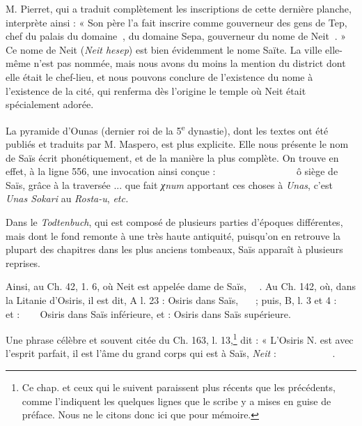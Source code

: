 \documentclass[letterpaper,twocolumn,openany,nodeprecatedcode]{dndbook}
\newcommand*\hieroAAAD{}
\newcommand*\hieroAAAF{}
\newcommand*\hieroAAAG{}
\newcommand*\hieroAAAH{}
\newcommand*\hieroAAAI{}
\newcommand*\hieroAAAQ{}
\newcommand*\hieroAAAW{\raisebox{0.5ex}{}}
\newcommand*\hieroAABC{\raisebox{0.5ex}{}}
\newcommand*\hieroAABG{}
\newcommand*\hieroAABR{}
\newcommand*\hieroAABU{}
\newcommand*\hieroAABV{}
\newcommand*\hieroAABW{}
\newcommand*\hieroAABX{}
\newcommand*\hieroAABY{\raisebox{0.5ex}{}}
\newcommand*\hieroAABZ{}
\newcommand*\hieroAACA{}
\newcommand*\hieroAACB{\raisebox{0.5ex}{}}
\newcommand*\hieroAACC{}
\newcommand*\hieroAACD{}
\newcommand*\hieroAACE{}
\newcommand*\hieroAACF{}
\newcommand*\hieroAACG{}
\newcommand*\hieroAACH{}
\newcommand*\hieroAACI{}
\newcommand*\hieroAACJ{}
\newcommand*\hieroAACK{}
\newcommand*\hieroAACL{\raisebox{0.5ex}{}}
\newcommand*\hieroAACM{}
\newcommand*\hieroAACN{\raisebox{1ex}{}}
\newcommand*\hieroAACO{}
\newcommand*\hieroAACP{}
\newcommand*\hieroAACQ{}
\newcommand*\hieroAACR{}
\newcommand*\hieroAACS{}
\newcommand*\hieroAACT{}
\newcommand*\hieroAACU{}
\newcommand*\hieroAACV{}
\newcommand*\hieroAACW{}
\newcommand*\hieroAACX{}
\newcommand*\hieroAACY{}
\newcommand*\hieroAACZ{}
\newcommand*\hieroAADA{}
\newcommand*\hieroAADB{}
\newcommand*\hieroAADC{\raisebox{0.5ex}{}}
\newcommand*\hieroAADD{}
\newcommand*\hieroAADE{}
\newcommand*\hieroAADF{}
\newcommand*\hieroAADG{}
\newcommand*\hieroAADH{}
\newcommand*\hieroAADI{\raisebox{0.5ex}{}}
\newcommand*\hieroAADJ{}
\newcommand*\hieroAADK{}
\newcommand*\hieroAADL{}
\newcommand*\hieroAADM{}
\newcommand*\hieroAADN{}
\newcommand*\hieroAADO{}
\newcommand*\hieroAADP{}
\newcommand*\hieroAADQ{}
\newcommand*\hieroAADR{}
\begin{document}
M. Pierret, qui a traduit complètement les inscriptions de cette dernière planche, interprète ainsi : « Son père l'a fait inscrire comme gouverneur des gens de Tep, chef du palais du domaine $\hieroAABU\:\hieroAABV$, du domaine Sepa, gouverneur du nome de Neit $\hieroAABG\:\hieroAABW$. » Ce nome de Neit (\emph{Neit hesep}) est bien évidemment le nome Saïte. La ville elle-même n'est pas nommée, mais nous avons du moins la mention du district dont elle était le chef-lieu, et nous pouvons conclure de l'existence du nome à l'existence de la cité, qui renferma dès l'origine le temple où Neit était spécialement adorée.

La pyramide d'Ounas (dernier roi de la 5\textsuperscript{e} dynastie), dont les textes ont été publiés et traduits par M. Maspero, est plus explicite. Elle nous présente le nom de Saïs écrit phonétiquement, et de la manière la plus complète. On trouve en effet, à la ligne 556, une invocation ainsi conçue : $\hieroAABX\:\hieroAABY\:\hieroAABZ\:\hieroAAAI\allowbreak\:\hieroAACA\:\hieroAACB\:\hieroAAAW\:\hieroAABR\:\hieroAACC\allowbreak\:\hieroAACD\:\hieroAAAH\:\hieroAACE\:\hieroAAAH\allowbreak\:\hieroAAAH\:\hieroAACF\:\hieroAACB\:\hieroAACG\allowbreak\:\hieroAACH\:\hieroAACI\:\hieroAAAH\:\hieroAACJ\allowbreak\:\hieroAACK\:\hieroAACL\:\hieroAACM\:\hieroAACN\:\hieroAACO\allowbreak\:\hieroAACO\:\hieroAACP\:\hieroAACQ\:\hieroAACN\allowbreak\:\hieroAAAH\:\hieroAACR\:\hieroAACS\:\hieroAACT\:\hieroAACU$ ô siège de Saïs, grâce à la traversée ... que fait \emph{χnum} apportant ces choses à \emph{Unas}, c'est \emph{Unas Sokari} au \emph{Rosta-u}, \emph{etc.}

Dans le \emph{Todtenbuch}, qui est composé de plusieurs parties d'époques différentes, mais dont le fond remonte à une très haute antiquité, puisqu'on en retrouve la plupart des chapitres dans les plus anciens tombeaux, Saïs apparaît à plusieurs reprises.

Ainsi, au Ch. 42, 1. 6, où Neit est appelée dame de Saïs, $\hieroAACV\:\hieroAABC\:\hieroAACW\:\hieroAACX\:\hieroAACY$. Au Ch. 142, où, dans la Litanie d'Osiris, il est dit, A l. 23 : Osiris dans Saïs, $\hieroAACZ\:\hieroAADA\:\hieroAAAI\allowbreak\:\hieroAAAG\:\hieroAAAF\:\hieroAADB$ ; puis, B, l. 3 et 4 : $\hieroAACZ\:\hieroAADA\:\hieroAAAI\allowbreak\:\hieroAADC\:\hieroAAAW\:\hieroAADD\:\hieroAADB$ et : $\hieroAACZ\:\hieroAABR\:\hieroAAAD\:\hieroAADC\:\hieroAAAW\:\hieroAADE\:\hieroAADB$ Osiris dans Saïs inférieure, et : Osiris dans Saïs supérieure.

Une phrase célèbre et souvent citée du Ch. 163, l. 13,\footnote{Ce chap. et ceux qui le suivent paraissent plus récents que les précédents, comme l'indiquent les quelques lignes que le scribe y a mises en guise de préface. Nous ne le citons donc ici que pour mémoire.} dit : « L'Osiris N. est avec l'esprit parfait, il est l'âme du grand corps qui est à Saïs, \emph{Neit} : $\hieroAAAH\:\hieroAADF\:\hieroAACR\:\hieroAADG\allowbreak\:\hieroAADH\:\hieroAADI\:\hieroAADB\:\hieroAAAH\allowbreak\:\hieroAADJ\:\hieroAADK\:\hieroAADL\:\hieroAADM\allowbreak\:\hieroAADN\:\hieroAACN\:\hieroAADO\allowbreak\:\hieroAADP\:\hieroAADQ\:\hieroAADR\:\hieroAABR\allowbreak\:\hieroAAAD\:\hieroAAAG\:\hieroAADC\:\hieroAAAW\allowbreak\:\hieroAAAQ\:\hieroAACY$.
\end{document}
